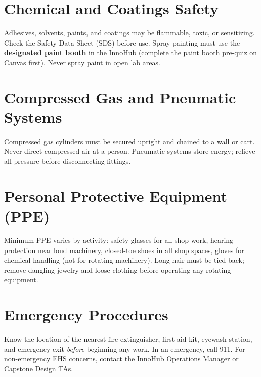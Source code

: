 \section*{Chemical and Coatings Safety}
Adhesives, solvents, paints, and coatings may be flammable, toxic, or sensitizing. Check the Safety Data Sheet (SDS) before use. Spray painting must use the \textbf{designated paint booth} in the InnoHub (complete the paint booth pre-quiz on Canvas first). Never spray paint in open lab areas.

\section*{Compressed Gas and Pneumatic Systems}
Compressed gas cylinders must be secured upright and chained to a wall or cart. Never direct compressed air at a person. Pneumatic systems store energy; relieve all pressure before disconnecting fittings.

\section*{Personal Protective Equipment (PPE)}
Minimum PPE varies by activity: safety glasses for all shop work, hearing protection near loud machinery, closed-toe shoes in all shop spaces, gloves for chemical handling (not for rotating machinery). Long hair must be tied back; remove dangling jewelry and loose clothing before operating any rotating equipment.

\section*{Emergency Procedures}
Know the location of the nearest fire extinguisher, first aid kit, eyewash station, and emergency exit \emph{before} beginning any work. In an emergency, call 911. For non-emergency EHS concerns, contact the InnoHub Operations Manager or Capstone Design TAs.


